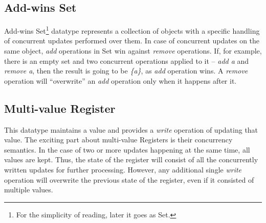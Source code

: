 \subsection*{Add-wins Set}

Add-wins Set\footnote{For the simplicity of reading, later it goes as Set.} datatype represents a collection of objects with a specific handling of concurrent updates performed over them. In case of concurrent updates on the same object, \textit{add} operations in Set win against \textit{remove} operations. If, for example, there is an empty set \textit{} and two concurrent operations applied to it -- \textit{add a} and \textit{remove a}, then the result is going to be \textit{\{a\}}, as \textit{add} operation wins. A \textit{remove} operation will ``overwrite'' an \textit{add} operation only when it happens after it\cite{3}. 

\subsection*{Multi-value Register}

This datatype maintains a value and provides a \textit{write} operation of updating that value. The exciting part about multi-value Registers is their concurrency semantics. In the case of two or more updates happening at the same time, all values are kept. Thus, the state of the register will consist of all the concurrently written updates for further processing. However, any additional single \textit{write} operation will overwrite the previous state of the register, even if it consisted of multiple values\cite{39}.